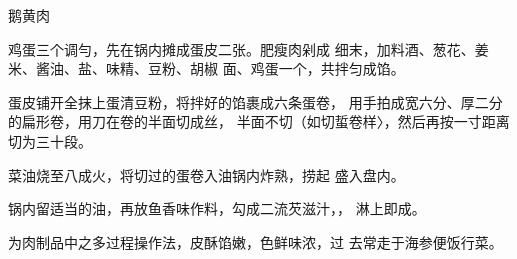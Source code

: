 \begin{recipe}{鹅黄肉}

\ingredients


\cooking

\step 鸡蛋三个调勻，先在锅内摊成蛋皮二张。肥瘦肉剁成 细末，加料酒、葱花、姜米、酱油、盐、味精、豆粉、胡椒 面、鸡蛋一个，共拌匀成馅。

\step 	蛋皮铺开全抹上蛋清豆粉，将拌好的馅裹成六条蛋卷， 用手拍成宽六分、厚二分的扁形卷，用刀在卷的半面切成丝， 半面不切（如切蜇卷样〉，然后再按一寸距离切为三十段。

\step 	菜油烧至八成火，将切过的蛋卷入油锅内炸熟，捞起 盛入盘内。

\step 	锅内留适当的油，再放鱼香味作料，勾成二流芡滋汁，， 淋上即成。

\notes

为肉制品中之多过程操作法，皮酥馅嫩，色鲜味浓，过 去常走于海参便饭行菜。\

\end{recipe}

